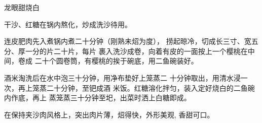 \begin{recipe}{龙眼甜烧白}

\ingredients


\cooking

\step 干沙、红糖在锅内熬化，炒成洗沙待用。

\step 连皮肥肉先入煮锅内煮二十分钟（刚熟未炤为度）， 捞起晾冷，切成长三寸、宽五分、厚一分的片二十片，每片 裹入洗沙成卷，向着有皮的一面按上一个樱桃在中间，卷成 二十个圆卷筒，有樱桃的挨于碗底，用二鱼碗装好。

\step 酒米淘洗后在水中泡三十分钟，用净布垫好上笼蒸二 十分钟取出，用清水浸一次，再上笼蒸二十分钟，至钯成酒 米饭。红糖溶化拌匀，装入定好烧白的二鱼碗内作底，再上 蒸笼蒸三十分钟至圯，出菜时洒上白糖即成。

\notes

在保持夹沙肉风格上，突出肉片薄，炤得快，外形美观, 香甜可口。

\end{recipe}

